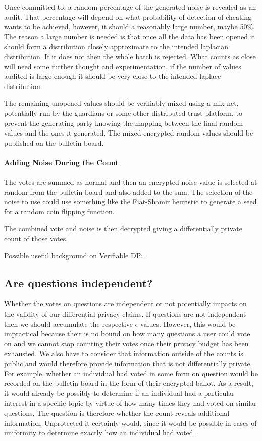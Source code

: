 \documentclass[10pt,a4paper]{article}
\begin{document}
Once committed to, a random percentage of the generated noise is revealed as an audit. That percentage will depend on what probability of detection of cheating wants to be achieved, however, it should a reasonably large number, maybe 50\%. The reason a large number is needed is that once all the data has been opened it should form a distribution closely approximate to the intended laplacian distribution. If it does not then the whole batch is rejected. What counts as close will need some further thought and experimentation, if the number of values audited is large enough it should be very close to the intended laplace distribution.

The remaining unopened values should be verifiably mixed using a mix-net, potentially run by the guardians or some other distributed trust platform, to prevent the generating party knowing the mapping between the final random values and the ones it generated. The mixed encrypted random values should be published on the bulletin board.

\paragraph{Adding Noise During the Count}

The votes are summed as normal and then an encrypted noise value is selected at random from the bulletin board and also added to the sum. The selection of the noise to use could use something like the Fiat-Shamir heuristic to generate a seed for a random coin flipping function.

The combined vote and noise is then decrypted giving a differentially private count of those votes.

Possible useful background on Verifiable DP: \cite{narayan2015verifiable,kato2021preventing}.

\subsection{Are questions independent?}
Whether the votes on questions are independent or not potentially impacts on the validity of our differential privacy claims. If questions are not independent then we should accumulate the respective $\epsilon$ values. However, this would be impractical because their is no bound on how many questions a user could vote on and we cannot stop counting their votes once their privacy budget has been exhausted. We also have to consider that information outside of the counts is public and would therefore provide information that is not differentially private. For example, whether an individual had voted in some form on question would be recorded on the bulletin board in the form of their encrypted ballot. As a result, it would already be possibly to determine if an individual had a particular interest in a specific topic by virtue of how many times they had voted on similar questions. The question is therefore whether the count reveals additional information. Unprotected it certainly would, since it would be possible in cases of uniformity to determine exactly how an individual had voted. 
\end{document}
